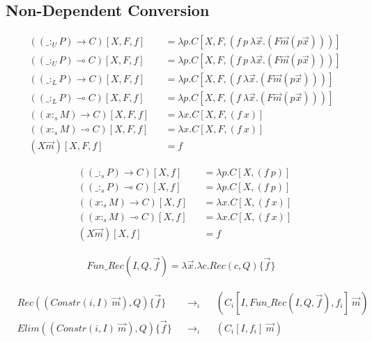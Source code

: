 \message{ !name(scratch.tex)}\documentclass{article}
\begin{document}
\subsection{Non-Dependent Conversion}

\begin{align*}
  & ((\_ :_U P) \rightarrow C)[X,F,f] && = \lambda p.C[X,F,(f\ p\ \lambda \overrightarrow{x}.(F \overrightarrow{m} (p \overrightarrow{x})))] \\
  & ((\_ :_U P) \multimap C)[X,F,f] && = \lambda p.C[X,F,(f\ p\ \lambda \overrightarrow{x}.(F \overrightarrow{m} (p \overrightarrow{x})))] \\
  & ((\_ :_L P) \rightarrow C)[X,F,f] && = \lambda p.C[X,F,(f\ \lambda \overrightarrow{x}.(F \overrightarrow{m} (p \overrightarrow{x})))] \\
  & ((\_ :_L P) \multimap C)[X,F,f] && = \lambda p.C[X,F,(f\ \lambda \overrightarrow{x}.(F \overrightarrow{m} (p \overrightarrow{x})))] \\
  & ((x :_s M) \rightarrow C)[X,F,f] && = \lambda x.C[X,F,(f\ x)] \\
  & ((x :_s M) \multimap C)[X,F,f] && = \lambda x.C[X,F,(f\ x)] \\
  & (X \overrightarrow{m})[X,F,f] && = f
\end{align*}

\begin{align*}
  & ((\_ :_s P) \rightarrow C)[X,f] && = \lambda p.C[X,(f\ p)] \\
  & ((\_ :_s P) \multimap C)[X,f] && = \lambda p.C[X,(f\ p)] \\
  & ((x :_s M) \rightarrow C)[X,f] && = \lambda x.C[X,(f\ x)] \\
  & ((x :_s M) \multimap C)[X,f] && = \lambda x.C[X,(f\ x)] \\
  & (X \overrightarrow{m})[X,f] && = f
\end{align*}

\begin{align*}
  Fun\_Rec(I,Q,\overrightarrow{f}) = \lambda \overrightarrow{x}. \lambda c.Rec(c,Q)\{\overrightarrow{f}\}
\end{align*}

\begin{align*}
  & Rec((Constr(i, I)\ \overrightarrow{m}), Q)\{\overrightarrow{f}\} && \rightarrow_\iota && (C_i[I,Fun\_Rec(I,Q,\overrightarrow{f}),f_i]\ \overrightarrow{m}) \\
  & Elim((Constr(i, I)\ \overrightarrow{m}), Q)\{\overrightarrow{f}\} && \rightarrow_\iota && (C_i[I,f_i]\ \overrightarrow{m})
\end{align*}
\end{document}
